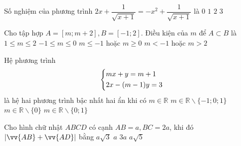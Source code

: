 \begin{ex}%
Số nghiệm của phương trình $2x+\dfrac{1}{\sqrt{x+1}}=-x^2+\dfrac{1}{\sqrt{x+1}}$ là
\choice
{$0$}
{\True $1$}
{$2$}
{$3$}
\end{ex}

\begin{ex}%
Cho tập hợp $A=[m;m+2],B=[-1;2]$. Điều kiện của $m$ để $A\subset B$ là
\choice
{$1\le m\le 2$}
{\True $-1\le m\le 0$}
{$m\le -1$ hoặc $m\ge 0$}
{$m<-1$ hoặc $m>2$}
\end{ex}

\begin{ex}%
Hệ phương trình $$\left\{\begin{aligned}& mx+y=m+1\\& 2x-(m-1)y=3\end{aligned}\right.$$ là hệ hai phương trình bậc nhất hai ẩn khi có
\choice
{\True $m\in\mathbb R$}
{$m\in\mathbb R\backslash\{-1;0;1\}$}
{$m\in\mathbb R\backslash\{0\}$}
{$m\in\mathbb R\backslash\{0;1\}$}
\end{ex}

\begin{ex}%
Cho hình chữ nhật $ABCD$ có cạnh $AB=a,BC=2a$, khi đó $\left|\vv{AB}+\vv{AD}\right|$ bằng
\choice
{$a\sqrt3$}
{$a$}
{$3a$}
{\True $a\sqrt5$}
\end{ex}

